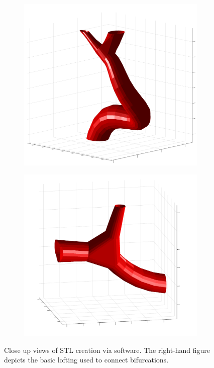 \documentclass[11pt,english,a4paper,twoside,openright]{report}
\begin{document}
{{{{{{{{\begin{figure}[h]
	\centering	
	\begin{subfigure}[b]{0.45\textwidth}
		\includegraphics[width=\textwidth]{3DFullVessels/arteries3D2}
	\end{subfigure}
	\begin{subfigure}[b]{0.45\textwidth}
		\includegraphics[width=\textwidth]{3DFullVessels/arteries3D3}
	\end{subfigure}
	\caption[Close up views of STL creation via software]{Close up views of STL creation via software. The right-hand figure depicts the basic lofting used to connect bifurcations.}
	\label{fig:3DarteriesParts}
\end{figure}

}}}}}}}}
\end{document}

